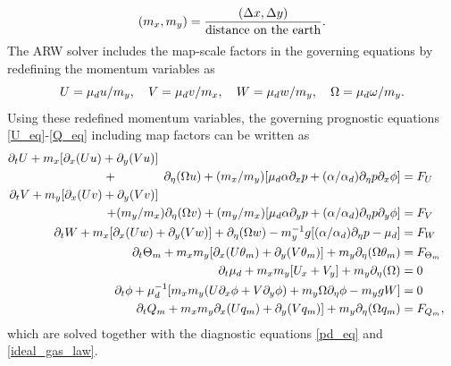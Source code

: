 \begin{equation}
(m_x,m_y) = {(\Delta x, \Delta y) \over \hbox{distance on the earth}}.
\label{map_scale}
\end{equation}
%
\noindent
The ARW solver includes the map-scale factors in the governing equations
by redefining the momentum variables as
%
\begin{equation}
U = {\mu}_d u/m_y,~~~V = {\mu}_d v/m_x, ~~~W = \mu_d w / m_y, 
~~~\Omega = \mu_d \omega /m_y.
\notag
\end{equation}
%
\noindent
Using these redefined momentum variables, 
the governing prognostic equations \eqref{U_eq}-\eqref{Q_eq} including map factors 
can be written as
%
\begin{align}
\partial_t U + m_x[\partial_x(Uu) + \partial_y(Vu)] \hphantom{\quad\quad\quad\quad\quad\quad\quad\quad\quad\quad\quad\quad\quad\quad\quad\quad\quad\quad\quad\quad}
\notag \\ 
+ \hphantom{(m_y/m_x)} 
\partial_\eta (\Omega u)
+ (m_x/m_y)[\mu_d \alpha \partial_x p
+ (\alpha/\alpha_d) \partial_\eta p \partial_x \phi] & = F_U
\label{u-mom-full}
\\
%
\partial_t V + m_y[\partial_x (Uv) + \partial_y (Vv)] \hphantom{\quad\quad\quad\quad\quad\quad\quad\quad\quad\quad\quad\quad\quad\quad\quad\quad\quad\quad\quad\quad}
\notag \\ + (m_y/m_x)\partial_\eta (\Omega v)
+ (m_y/m_x)[\mu_d \alpha \partial_y p
+ (\alpha/\alpha_d) \partial_\eta p \partial_y \phi] & = F_V
\label{v-mom-full}
\\
%
\partial_t W + m_x [\partial_x (Uw) + \partial_y (Vw)] + \partial_\eta (\Omega w)
- m_y^{-1} g [ (\alpha/\alpha_d) \partial_\eta p - \mu_d ] & = F_W 
\label{w-mom-full}
\\
%
\partial_t \Theta_m + 
m_x m_y[\partial_x (U\theta_m) + \partial_y (V\theta_m)] + m_y \partial_\eta (\Omega \theta_m)
& = F_{\Theta_m} 
\label{tm_full} \\
%
\partial_t \mu_d + m_x m_y[U_x + V_y] + m_y \partial_\eta (\Omega)
& = 0 
\label{mass-cons-full}
\\
%
\partial_t \phi + \mu_d^{-1} [m_x m_y (U\partial_x\phi + V\partial_y\phi) + m_y
\Omega\partial_\eta\phi - m_y gW ] & = 0
\label{geo-full}
\\
%
\partial_t Q_m + 
m_x m_y \partial_x (U q_m) + \partial_y (V q_m)] + m _y\partial_\eta (\Omega q_m)
& = F_{Q_m},
\label{qm_full}%
\end{align}
\noindent
which are solved together with the diagnostic equations \eqref{pd_eq} and \eqref{ideal_gas_law}.
%
%
\noindent
%
%

